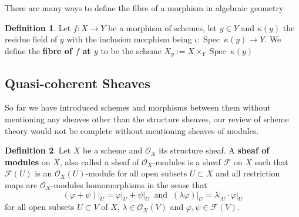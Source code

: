 \documentclass{article}
\theoremstyle{plain}
\newtheorem{theorem}{Theorem}[subsection]
\theoremstyle{definition}
\newtheorem{definition}[theorem]{Definition}
\DeclareMathOperator{\Spec}{Spec}
\begin{document}
\noindent There are many ways to define the fibre of a morphism in algebraic geometry

\begin{definition}
    Let $f:X\rightarrow Y$ be a morphism of schemes, let $y\in Y$ and $\kappa(y)$ the residue field of $y$ with the inclusion morphism being $\iota: \Spec\:\kappa(y)\rightarrow Y$.
    We define the \textbf{fibre of $f$ at $y$} to be the scheme $X_y := X\times_Y \Spec\:\kappa(y)$
\end{definition}

\subsection{Quasi-coherent Sheaves}
\label{annexe_quasi_coherent}
So far we have introduced schemes and morphisms between them without mentioning any sheaves other than the structure sheaves, our review of scheme theory would not be complete without mentioning sheaves of modules.

\begin{definition}
    Let $X$ be a scheme and $\mathcal{O}_X$ its structure sheaf.
    A \textbf{sheaf of modules} on $X$, also called a sheaf of $\mathcal{O}_X$-modules is a sheaf $\mathcal{F}$ on $X$ such that 
    $\mathcal{F}(U)$ is an $\mathcal{O}_X(U)$-module for all open subsets $U\subset X$ and all restriction maps are $\mathcal{O}_X$-modules homomorphisms in the sense that 
    $$(\varphi +\psi)\vert_U = \varphi\vert_U + \psi\vert_U \: \text{ and }\: (\lambda\varphi)\vert_U = \lambda\vert_U\cdot \varphi\vert_U$$
    for all open subsets $U\subset V$ of $X$, $\lambda\in \mathcal{O}_X(V)$ and $\varphi,\psi\in\mathcal{F}(V)$.
\end{definition}
\end{document}
